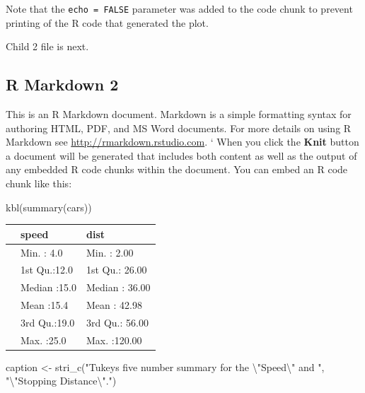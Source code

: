 \documentclass[
]{article}
\newenvironment{Shaded}{\begin{snugshade}}{\end{snugshade}}
\newcommand{\FunctionTok}[1]{\textcolor[rgb]{0.00,0.00,0.00}{#1}}
\newcommand{\NormalTok}[1]{#1}
\newcommand{\OtherTok}[1]{\textcolor[rgb]{0.56,0.35,0.01}{#1}}
\newcommand{\SpecialCharTok}[1]{\textcolor[rgb]{0.00,0.00,0.00}{#1}}
\newcommand{\StringTok}[1]{\textcolor[rgb]{0.31,0.60,0.02}{#1}}
\begin{document}
Note that the \texttt{echo\ =\ FALSE} parameter was added to the code chunk to prevent printing of the R code that generated the plot.

Child 2 file is next.

\hypertarget{rmarkdown-2}{%
\subsection{R Markdown 2}\label{rmarkdown-2}}

This is an R Markdown document. Markdown is a simple formatting syntax for authoring HTML, PDF, and MS Word documents. For more details on using R Markdown see \url{http://rmarkdown.rstudio.com}.
`
When you click the \textbf{Knit} button a document will be generated that includes both content as well as the output of any embedded R code chunks within the document. You can embed an R code chunk like this:

\begin{Shaded}
\begin{Highlighting}[]
\FunctionTok{kbl}\NormalTok{(}\FunctionTok{summary}\NormalTok{(cars))}
\end{Highlighting}
\end{Shaded}

\begin{tabular}[t]{l|l|l}
\hline
  &     speed &      dist\\
\hline
 & Min.   : 4.0 & Min.   :  2.00\\
\hline
 & 1st Qu.:12.0 & 1st Qu.: 26.00\\
\hline
 & Median :15.0 & Median : 36.00\\
\hline
 & Mean   :15.4 & Mean   : 42.98\\
\hline
 & 3rd Qu.:19.0 & 3rd Qu.: 56.00\\
\hline
 & Max.   :25.0 & Max.   :120.00\\
\hline
\end{tabular}

\begin{Shaded}
\begin{Highlighting}[]
\NormalTok{caption }\OtherTok{\textless{}{-}} \FunctionTok{stri\_c}\NormalTok{(}\StringTok{"Tukey\textquotesingle{}s five number summary for the }\SpecialCharTok{\textbackslash{}"}\StringTok{Speed}\SpecialCharTok{\textbackslash{}"}\StringTok{ and "}\NormalTok{,}
                  \StringTok{"}\SpecialCharTok{\textbackslash{}"}\StringTok{Stopping Distance}\SpecialCharTok{\textbackslash{}"}\StringTok{."}\NormalTok{)}
\end{Highlighting}
\end{Shaded}
\end{document}

